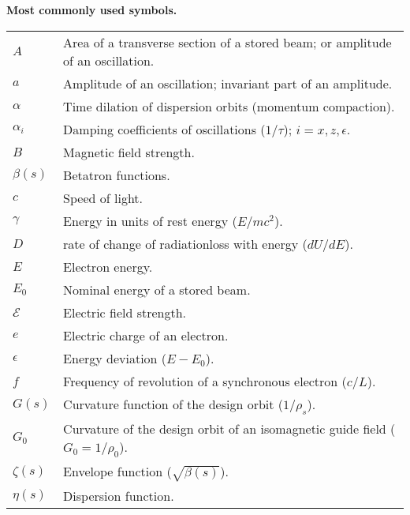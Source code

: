 \begin{center}
	\textbf{\large Most commonly used symbols.}
\end{center}

\begin{tabularx}{\linewidth}{@{}lX@{}}
	$A$			& Area of a transverse section of a stored beam; or amplitude of an oscillation.\\
	$a$			& Amplitude of an oscillation; invariant part of an amplitude.\\
    $\alpha$	& Time dilation of dispersion orbits (momentum compaction).\\
	$\alpha_i$	& Damping coefficients of oscillations ($1/\tau$); $i = x, z, \epsilon$.\\
    $B$			& Magnetic field strength.\\
	$\beta(s)$	& Betatron functions.\\
	$c$			& Speed of light.\\
	$\gamma$	& Energy in units of rest energy ($E/mc^2$).\\
	$D$			& %
    				rate of change of radiationloss with energy ($dU/dE$).\\
	$E$			& Electron energy.\\
    $E_0$		& Nominal energy of a stored beam.\\
    $\mathscr{E}$ & Electric field strength.\\
    $e$			& Electric charge of an electron.\\
	$\epsilon$	& Energy deviation ($E - E_0$).\\
    $f$			& Frequency of revolution of a synchronous electron ($c/L$).\\
    $G(s)$		& Curvature function of the design orbit ($1/\rho_s$).\\
    $G_0$		& Curvature of the design orbit of an isomagnetic guide field ($G_0 = 1/\rho_0$).\\
	$\zeta(s)$	& Envelope function ($\sqrt{\beta(s)}$).\\
    $\eta(s)$	& Dispersion function.\\

\end{tabularx}
